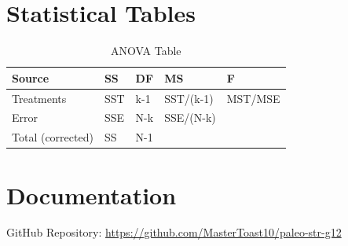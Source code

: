 \documentclass{strrespaper-trad}
\begin{document}
	\chapter{Statistical Tables}
		\begin{table}[htbp]
			\centering
			\caption{ANOVA Table}
			\label{tab:ANOVA}
			\begin{tabular}{lllll}
				\toprule
				Source            & SS  & DF  & MS        & F       \\
				\midrule
				Treatments        & SST & k-1 & SST/(k-1) & MST/MSE \\
				Error             & SSE & N-k & SSE/(N-k) &         \\
				Total (corrected) & SS  & N-1 &           &         \\
				\bottomrule
			\end{tabular}
		\end{table}

	\chapter{Documentation} \label{apx:documentation}
		\medskip\bigskip
		GitHub Repository: \url{https://github.com/MasterToast10/paleo-str-g12}
\end{document}
